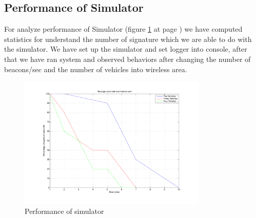 \subsection{Performance of Simulator}
For analyze performance of Simulator (figure \ref{fig:performance} at page \pageref{fig:performance}) we have computed statistics for understand the number of signature which we are able to do with the simulator. We have set up the \baseline simulator and set logger into console, after that we have ran system and observed behaviors after changing  the number of beacons/sec and the number of vehicles into wireless area.
\begin{figure}[ht]
\centerline{\includegraphics[width=0.8\textwidth]{chart_baseline.pdf}}
\caption{Performance of simulator}
\label{fig:performance}
\end{figure}